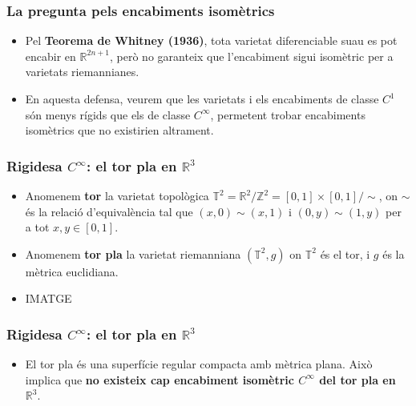 \documentclass[aspectratio=169]{beamer}
\begin{document}
\begin{frame}
    \frametitle{La pregunta pels encabiments isomètrics}
    
    \begin{itemize}
      \begin{block}{Pregunta Central}
        És sempre possible trobar un encabiment isomètric d'una varietat riemanniana en algun espai euclidià $\mathbb{R}^N$?
      \end{block}
      \pause
      \item<2-> Pel \textbf{Teorema de Whitney (1936)}, tota varietat diferenciable suau es pot encabir en $\mathbb{R}^{2n+1}$, però no garanteix que l'encabiment sigui isomètric per a varietats riemannianes.
      \item<3-> En aquesta defensa, veurem que les varietats i els encabiments de classe $C^1$ són menys rígids que els de classe $C^\infty$, permetent trobar encabiments isomètrics que no existirien altrament.
    \end{itemize}
\end{frame}

\begin{frame}
    \frametitle{Rigidesa $C^\infty$: el tor pla en $\mathbb{R}^3$}
      \begin{itemize}
          \item<1->     Anomenem \textbf{tor} la varietat topològica $\mathbb T^2 = \mathbb R^2/\mathbb Z^2 = [0,1]\times[0,1]/\sim$, on $\sim$ és la relació d'equivalència tal que $(x,0)\sim(x,1)$ i $(0,y)\sim(1,y)$ per a tot $x,y\in[0,1]$. 
          \item<1->Anomenem \textbf{tor pla} la varietat riemanniana $(\mathbb T^2, g)$ on $\mathbb T^2$ és el tor, i $g$ és la mètrica euclidiana.
          \pause
          \item<2-> IMATGE
      \end{itemize}
  \end{frame}
\begin{frame}
  \frametitle{Rigidesa $C^\infty$: el tor pla en $\mathbb{R}^3$}
    \begin{itemize}
        \begin{block}{Theorema Egregium (Gauss)}
            La curvatura de Gauss és una propietat intrínseca de les superfícies regulars encabides en $\mathbb{R}^3$. Si un encabiment és isomètric, la curvatura de la imatge ha de ser la mateixa que la de la varietat original.
        \end{block}
        \begin{block}{Teorema}
            Tota superfície regular compacta encabida suaument en $\mathbb{R}^3$ ha de tenir curvatura gaussiana positiva en algun punt.
        \end{block}
        \pause
        \item<2-> El tor pla és una superfície regular compacta amb mètrica plana. Això implica que \textbf{no existeix cap encabiment isomètric $C^\infty$ del tor pla en $\mathbb{R}^3$}.
    \end{itemize}
\end{frame}
\end{document}
